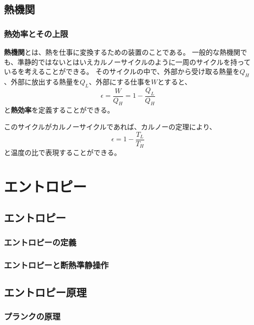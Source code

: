 \documentclass[a4paper]{jsreport}
\begin{document}
        \section{熱機関}    

            \subsection*{熱効率とその上限}
                \textbf{熱機関}とは、熱を仕事に変換するための装置のことである。
                一般的な熱機関でも、準静的ではないとはいえカルノーサイクルのように一周のサイクルを持っているを考えることができる。
                そのサイクルの中で、外部から受け取る熱量を$Q_H$、外部に放出する熱量を$Q_L$、外部にする仕事を$W$とすると、
                \begin{equation}
                    \epsilon = \frac{W}{Q_H} = 1 - \frac{Q_L}{Q_H}
                \end{equation}
                と\textbf{熱効率}を定義することができる。\par
                このサイクルがカルノーサイクルであれば、カルノーの定理により、
                \begin{equation}
                    \epsilon = 1 - \frac{T_L}{T_H}
                \end{equation}
                と温度の比で表現することができる。
    
    \chapter{エントロピー}
        \section{エントロピー}
            \subsection*{エントロピーの定義}
                
            \subsection*{エントロピーと断熱準静操作}
        \section{エントロピー原理}
            \subsection*{プランクの原理}
\end{document}

